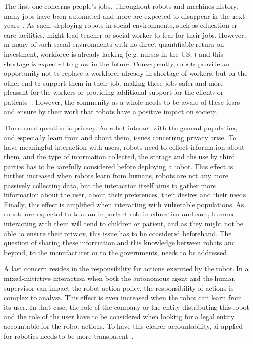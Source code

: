 The first one concerns people's jobs. Throughout robots and machines history, many jobs have been automated and more are expected to disappear in the next years~\citep{frey2017future}. As such, deploying robots in social environments, such as education or care facilities, might lead teacher or social worker to fear for their jobs. However, in many of such social environments with no direct quantifiable return on investment, workforce is already lacking (e.g. nurses in the US; \citealt{nevidjon2001nursing}) and this shortage is expected to grow in the future. Consequently, robots provide an opportunity not to replace a workforce already in shortage of workers, but on the other end to support them in their job, making these jobs safer and more pleasant for the workers or providing additional support for the clients or patients~\citep{belpaeme2012multimodal}. However, the community as a whole needs to be aware of these fears and ensure by their work that robots have a positive impact on society.

The second question is privacy. As robot interact with the general population, and especially learn from and about them, issues concerning privacy arise. To have meaningful interaction with users, robots need to collect information about them, and the type of information collected, the storage and the use by third parties has to be carefully considered before deploying a robot. This effect is further increased when robots learn from humans, robots are not any more passively collecting data, but the interaction itself aims to gather more information about the user, about their preferences, their desires and their needs. Finally, this effect is amplified when interacting with vulnerable populations. As robots are expected to take an important role in education and care, humans interacting with them will tend to children or patient, and as they might not be able to ensure their privacy, this issue has to be considered beforehand. The question of sharing these information and this knowledge between robots and beyond, to the manufacturer or to the governments, needs to be addressed.

A last concern resides in the responsibility for actions executed by the robot. In a mixed-initiative interaction when both the autonomous agent and the human supervisor can impact the robot action policy, the responsibility of actions is complex to analyse. This effect is even increased when the robot can learn from its user. In that case, the role of the company or the entity distributing this robot and the role of the user have to be considered when looking for a legal entity accountable for the robot actions. To have this clearer accountability, \gls{ai} applied for robotics needs to be more transparent~\citep{wachter2017transparent}.


